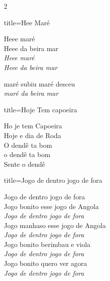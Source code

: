 \documentclass[fontsize=14pt, paper=a4, twoside, DIV=20]{scrreprt} %
\newcommand\chapTOC[1]{
    \chapter*{#1}
    \addcontentsline{toc}{chapter}{#1}
    \markboth{#1}{#1}}
\begin{document}
\begin{multicols*}{2}


\begin{song}{title={Hee Maré}}
        \begin{verse*}
            Heee maré \\
            Heee da beira mar\\
            \textit{
            Heee maré \\
            Heee da beira mar}

            maré subiu maré desceu \\
            \textit{maré da beira mar}

        \end{verse*}
\end{song}

\begin{song}{title={Hoje Tem capoeira}}
        \begin{verse*}
            Ho je tem Capoeira\\
            Hoje e dia de Roda\\
            O dendê ta bom\\
            o dendê ta bom\\
            Sente o dendê\\
        \end{verse*}
\end{song}



\begin{song}{title={Jogo de dentro jogo de fora}}
        \begin{verse*}
            Jogo de dentro jogo de fora\\
            Jogo bonito esse jogo de Angola\\
            \textit{Jogo de dentro jogo de fora}\\
            Jogo manhaso esse jogo de Angola\\
            \textit{Jogo de dentro jogo de fora}\\
            Jogo bonito berimbau e viola\\
            \textit{Jogo de dentro jogo de fora}\\
            Jogo bonito quero ver agora\\
            \textit{Jogo de dentro jogo de fora}\\
        \end{verse*}
\end{song}


\end{multicols*}
\end{document}

